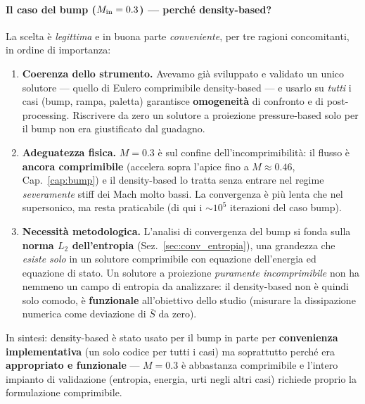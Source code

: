 \paragraph{Il caso del bump ($M_{\rm in}=0.3$) --- perché density-based?} La scelta è
\emph{legittima} e in buona parte \emph{conveniente}, per tre ragioni concomitanti, in
ordine di importanza:
\begin{enumerate}
  \item \textbf{Coerenza dello strumento.} Avevamo già sviluppato e validato un unico
    solutore --- quello di Eulero comprimibile density-based --- e usarlo su \emph{tutti}
    i casi (bump, rampa, paletta) garantisce \textbf{omogeneità} di confronto e di
    post-processing. Riscrivere da zero un solutore a proiezione pressure-based solo per il
    bump non era giustificato dal guadagno.
  \item \textbf{Adeguatezza fisica.} $M=0.3$ è sul confine dell'incomprimibilità: il flusso
    è \textbf{ancora comprimibile} (accelera sopra l'apice fino a $M\approx0.46$,
    Cap.~\ref{cap:bump}) e il density-based lo tratta senza entrare nel regime
    \emph{severamente} stiff dei Mach molto bassi. La convergenza è più lenta che nel
    supersonico, ma resta praticabile (di qui i $\sim10^5$ iterazioni del caso bump).
  \item \textbf{Necessità metodologica.} L'analisi di convergenza del bump si fonda sulla
    \textbf{norma $L_2$ dell'entropia} (Sez.~\ref{sec:conv_entropia}), una grandezza che
    \emph{esiste solo} in un solutore comprimibile con equazione dell'energia ed equazione
    di stato. Un solutore a proiezione \emph{puramente incomprimibile} non ha nemmeno un
    campo di entropia da analizzare: il density-based non è quindi solo comodo, è
    \textbf{funzionale} all'obiettivo dello studio (misurare la dissipazione numerica come
    deviazione di $\bar S$ da zero).
\end{enumerate}
In sintesi: density-based è stato usato per il bump in parte per \textbf{convenienza
implementativa} (un solo codice per tutti i casi) ma soprattutto perché era
\textbf{appropriato e funzionale} --- $M=0.3$ è abbastanza comprimibile e l'intero
impianto di validazione (entropia, energia, urti negli altri casi) richiede proprio la
formulazione comprimibile.

